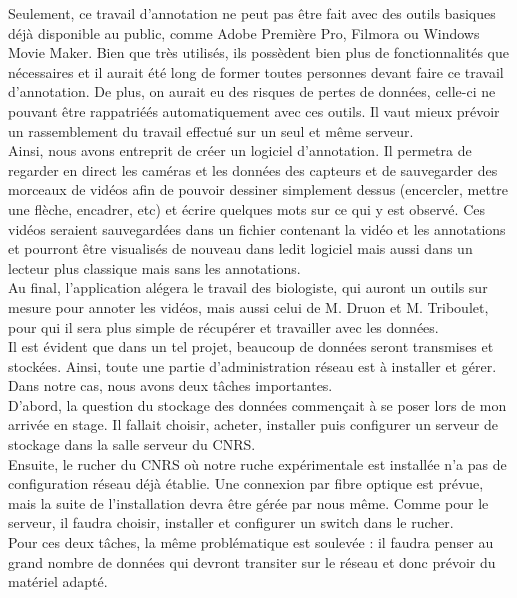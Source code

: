 \documentclass[11pt,french,a4paper]{report}
\begin{document}
Seulement, ce travail d'annotation ne peut pas être fait avec des outils basiques déjà disponible au public, comme Adobe Première Pro, 
Filmora ou Windows Movie Maker. Bien que très utilisés, ils possèdent bien plus de fonctionnalités que nécessaires et il aurait été long
de former toutes personnes devant faire ce travail d'annotation. De plus, on aurait eu des risques de pertes de données, celle-ci
ne pouvant être rappatriéés automatiquement avec ces outils. Il vaut mieux prévoir un rassemblement du travail effectué sur 
un seul et même serveur. \\

Ainsi, nous avons entreprit de créer un logiciel d'annotation. Il permetra de regarder en direct les caméras et 
les données des capteurs et de sauvegarder des morceaux de vidéos afin de pouvoir dessiner simplement dessus 
(encercler, mettre une flèche, encadrer, etc) et écrire quelques mots sur ce qui y est observé.
Ces vidéos seraient sauvegardées dans un fichier contenant la vidéo et les annotations et pourront être 
visualisés de nouveau dans ledit logiciel mais aussi dans un lecteur plus classique mais sans les annotations. \\
Au final, l'application alégera le travail des biologiste, qui auront un outils sur mesure pour annoter les vidéos, 
mais aussi celui de M. Druon et M. Triboulet, pour qui il sera plus simple de récupérer et travailler avec les données.\\

Il est évident que dans un tel projet, beaucoup de données seront transmises et stockées. Ainsi, toute une partie d'administration 
réseau est à installer et gérer. Dans notre cas, nous avons deux tâches importantes.\\
D'abord, la question du stockage des données commençait à se poser lors de mon arrivée en stage. Il fallait choisir, acheter, installer
puis configurer un serveur de stockage dans la salle serveur du CNRS.\\
Ensuite, le rucher du CNRS où notre ruche expérimentale est installée n'a pas de configuration réseau déjà établie. 
Une connexion par fibre optique est prévue, mais la suite de l'installation devra être gérée par nous même. Comme pour le serveur, 
il faudra choisir, installer et configurer un switch dans le rucher.\\
Pour ces deux tâches, la même problématique est soulevée : il faudra penser au grand nombre de données qui devront transiter sur le 
réseau et donc prévoir du matériel adapté.\\
\end{document}
